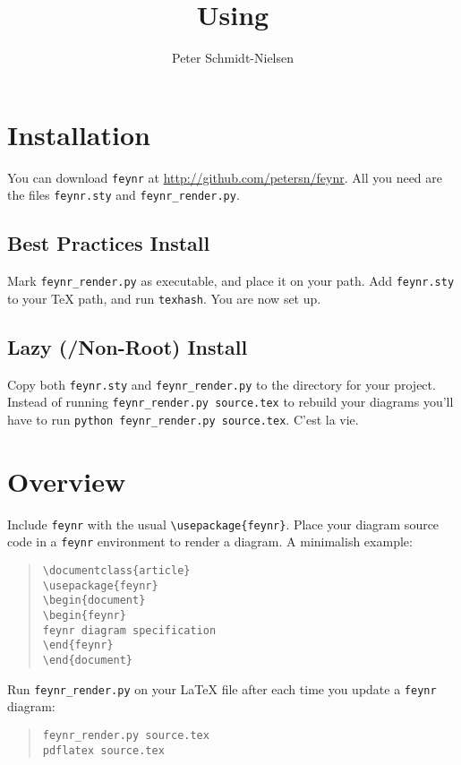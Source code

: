 \documentclass[12pt]{article}
\title{Using \feynR}
\author{Peter Schmidt-Nielsen}
\newcommand{\feynR}{\texttt{feynr}}
\begin{document}
\maketitle
\section*{Installation}
You can download \feynR{} at \url{http://github.com/petersn/feynr}.
All you need are the files \texttt{feynr.sty} and \texttt{feynr\_render.py}.
\subsection*{Best Practices Install}
Mark \texttt{feynr\_render.py} as executable, and place it on your path.
Add \texttt{feynr.sty} to your \TeX{} path, and run \texttt{texhash}.
You are now set up.
\subsection*{Lazy (/Non-Root) Install}
Copy both \texttt{feynr.sty} and \texttt{feynr\_render.py} to the directory for your project.
Instead of running \texttt{feynr\_render.py source.tex} to rebuild your diagrams you'll have to run \texttt{python feynr\_render.py source.tex}.
C'est la vie.

\section*{Overview}
Include \feynR{} with the usual \texttt{\textbackslash{}usepackage\{feynr\}}.
Place your diagram source code in a \feynR{} environment to render a diagram.
A minimalish example:
\begin{quote}
\texttt{\textbackslash{}documentclass\{article\}\\
\textbackslash{}usepackage\{feynr\}\\
\textbackslash{}begin\{document\}\\
\textbackslash{}begin\{feynr\}\\
feynr diagram specification\\
\textbackslash{}end\{feynr\}\\
\textbackslash{}end\{document\}}
\end{quote} 
Run \texttt{feynr\_render.py} on your \LaTeX{} file after each time you update a \feynR{} diagram:
\begin{quote}
\texttt{feynr\_render.py source.tex}\\
\texttt{pdflatex source.tex}
\end{quote}
\end{document}
